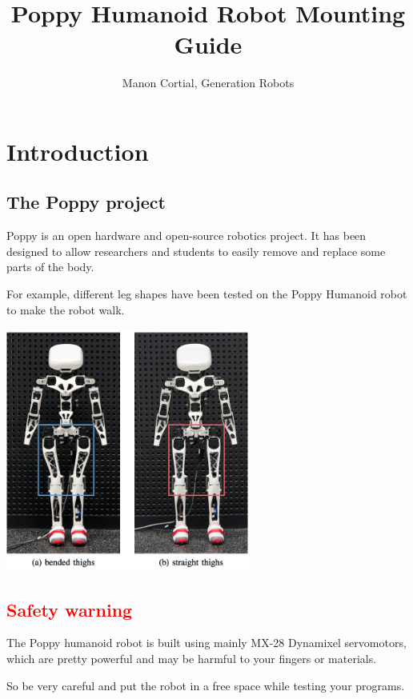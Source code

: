 \documentclass{article}
\begin{document}
\title{Poppy Humanoid Robot Mounting Guide}
\author{Manon Cortial, Generation Robots}

\maketitle

\section{Introduction}

\subsection{The Poppy project}

Poppy is an open hardware and open-source robotics project. It has been designed to allow researchers and students to easily remove and replace some parts of the body. 

For example,   different leg shapes have been tested on the Poppy Humanoid robot to make the robot walk.

 \begin{center}
  \includegraphics[width=0.6\textwidth]{humanoids2013_Experiments}
 \end{center}


\subsection{\textcolor{red}{Safety warning}}

The Poppy humanoid robot is built using mainly MX-28 Dynamixel servomotors, which are pretty powerful and may be harmful to your fingers or materials.

So be very careful and put the robot in a free space while testing your programs.
\end{document}
